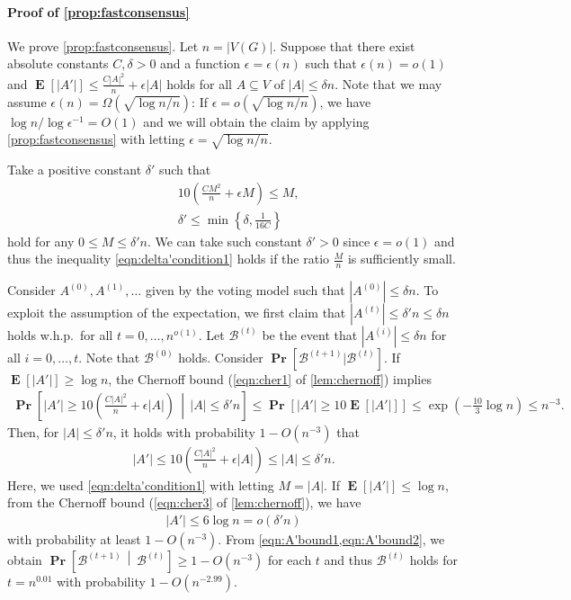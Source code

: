 \documentclass[letterpaper,11pt]{article}
\renewcommand\Pr{\mathop{\mathbf{Pr}}}
\DeclareMathOperator{\E}{\mathbf{E}}
\begin{document}
\paragraph*{Proof of \cref{prop:fastconsensus}}

We prove \cref{prop:fastconsensus}.
Let $n=|V(G)|$.
Suppose that there exist absolute constants $C,\delta>0$ and a function $\epsilon=\epsilon(n)$ such that $\epsilon(n)=o(1)$ and $\E[|A'|]\leq \frac{C|A|^2}{n}+\epsilon|A|$ holds for all $A\subseteq V$ of $|A|\leq \delta n$.
Note that we may assume $\epsilon(n)=\Omega(\sqrt{\log n/n})$: If $\epsilon=o(\sqrt{\log n/n})$, we have $\log n/\log \epsilon^{-1}=O(1)$ and we will obtain the claim by applying \cref{prop:fastconsensus} with letting $\epsilon=\sqrt{\log n/n}$.

Take a positive constant $\delta'$ such that
\begin{align}
&10\left(\frac{CM^2}{n}+\epsilon M\right) \leq M, \label{eqn:delta'condition1}\\
&\delta'\leq \min\left\{\delta,\frac{1}{16C}\right\} \label{eqn:delta'condition2}
\end{align}
hold for any $0\leq M\leq \delta'n$.
We can take such constant $\delta'>0$ since $\epsilon=o(1)$ and thus the inequality \cref{eqn:delta'condition1} holds if the ratio $\frac{M}{n}$ is sufficiently small.


Consider $A^{(0)},A^{(1)},\ldots$ given by the voting model such that $|A^{(0)}|\leq \delta n$.
To exploit the assumption of the expectation, we first claim that $|A^{(t)}|\leq \delta' n \leq \delta n$ holds w.h.p.~for all $t=0,\ldots,n^{o(1)}$.
Let $\mathcal{B}^{(t)}$ be the event that $|A^{(i)}|\leq \delta n$ for all $i=0,\ldots,t$.
Note that $\mathcal{B}^{(0)}$ holds.
Consider $\Pr[\mathcal{B}^{(t+1)}|\mathcal{B}^{(t)}]$.
If $\E[|A'|]\geq\log n$, the Chernoff bound (\ref{eqn:cher1} of \cref{lem:chernoff}) implies
\begin{align*}
\Pr\left[|A'|\geq 10\left(\frac{C|A|^2}{n}+\epsilon|A|\right) \,\middle|\, |A|\leq \delta'n\right]
\leq \Pr\left[|A'|\geq 10\E[|A'|]\right]
\leq \exp\left(-\frac{10}{3}\log n\right)
\leq n^{-3}.
\end{align*}
Then, for $|A|\leq \delta'n$, it holds with probability $1-O(n^{-3})$ that
\begin{align}
|A'|\leq 10\left(\frac{C|A|^2}{n}+\epsilon|A|\right)\leq |A|\leq\delta' n. \label{eqn:A'bound1}
\end{align}
Here, we used \cref{eqn:delta'condition1} with letting $M=|A|$.
If $\E[|A'|]\leq\log n$, from the Chernoff bound (\ref{eqn:cher3} of \cref{lem:chernoff}), we have %
\begin{align}
|A'|\leq 6\log n =o(\delta' n) \label{eqn:A'bound2}
\end{align}
with probability at least $1-O(n^{-3})$.
From \cref{eqn:A'bound1,eqn:A'bound2}, we obtain $\Pr\left[\mathcal{B}^{(t+1)}\,\middle|\, \mathcal{B}^{(t)}\right]\geq 1-O(n^{-3})$ for each $t$ and thus $\mathcal{B}^{(t)}$ holds for $t=n^{0.01}$ with probability $1-O(n^{-2.99})$.
\end{document}
